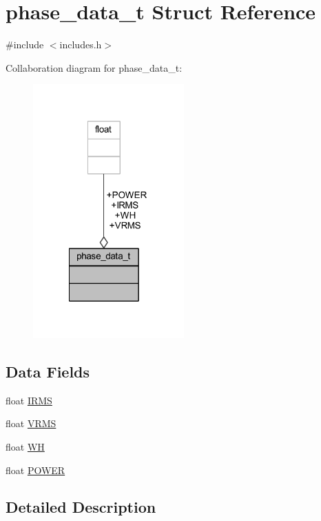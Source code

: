 \hypertarget{a00030}{\section{phase\-\_\-data\-\_\-t Struct Reference}
\label{d5/d79/a00030}
}


{\ttfamily \#include $<$includes.\-h$>$}



Collaboration diagram for phase\-\_\-data\-\_\-t\-:\nopagebreak
\begin{figure}[H]
\begin{center}
\leavevmode
\includegraphics[width=164pt]{d9/d77/a00095}
\end{center}
\end{figure}
\subsection*{Data Fields}
\begin{DoxyCompactItemize}
\item 
float \hyperlink{a00030_a4f87f30b543e89e2e5dfa1b8f3f58eff}{I\-R\-M\-S}
\item 
float \hyperlink{a00030_a08415029e214174a01bc6487ff98ee9b}{V\-R\-M\-S}
\item 
float \hyperlink{a00030_a8dd6d8406db4e214238b3eff481e4ea0}{W\-H}
\item 
float \hyperlink{a00030_a8a9794fa4c6a69b457d1eb04b017ef1e}{P\-O\-W\-E\-R}
\end{DoxyCompactItemize}


\subsection{Detailed Description}


